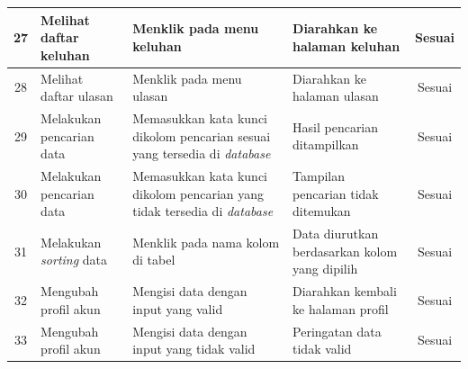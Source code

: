 \begin{longtable}{| m{0.5cm} | m{3.2cm} | m{3.4cm} | m{3.3cm} | m{1.6cm} |}
	\hline
	\multicolumn{1}{|c|}{{\footnotesize 27}} & {\footnotesize Melihat daftar keluhan} & {\footnotesize Menklik pada menu keluhan} & {\footnotesize Diarahkan ke halaman keluhan} & \multicolumn{1}{|c|}{{\footnotesize Sesuai}}\\
	\hline
	\multicolumn{1}{|c|}{{\footnotesize 28}} & {\footnotesize Melihat daftar ulasan} & {\footnotesize Menklik pada menu ulasan} & {\footnotesize Diarahkan ke halaman ulasan} & \multicolumn{1}{|c|}{{\footnotesize Sesuai}}\\
	\hline
	\multicolumn{1}{|c|}{{\footnotesize 29}} & {\footnotesize Melakukan pencarian data} & {\footnotesize Memasukkan kata kunci dikolom pencarian sesuai yang tersedia di \textit{database}} & {\footnotesize Hasil pencarian ditampilkan} & \multicolumn{1}{|c|}{{\footnotesize Sesuai}}\\
	\hline
	\multicolumn{1}{|c|}{{\footnotesize 30}} & {\footnotesize Melakukan pencarian data} & {\footnotesize Memasukkan kata kunci dikolom pencarian yang tidak tersedia di \textit{database}} & {\footnotesize Tampilan pencarian tidak ditemukan} & \multicolumn{1}{|c|}{{\footnotesize Sesuai}}\\
	\hline
	\multicolumn{1}{|c|}{{\footnotesize 31}} & {\footnotesize Melakukan \textit{sorting} data} & {\footnotesize Menklik pada nama kolom di tabel} & {\footnotesize Data diurutkan berdasarkan kolom yang dipilih} & \multicolumn{1}{|c|}{{\footnotesize Sesuai}}\\
	\hline
	\multicolumn{1}{|c|}{{\footnotesize 32}} & {\footnotesize Mengubah profil akun} & {\footnotesize Mengisi data dengan input yang valid} & {\footnotesize Diarahkan kembali ke halaman profil} & \multicolumn{1}{|c|}{{\footnotesize Sesuai}}\\
	\hline
	\multicolumn{1}{|c|}{{\footnotesize 33}} & {\footnotesize Mengubah profil akun} & {\footnotesize Mengisi data dengan input yang tidak valid} & {\footnotesize Peringatan data tidak valid} & \multicolumn{1}{|c|}{{\footnotesize Sesuai}}\\
	\hline
\end{longtable}

